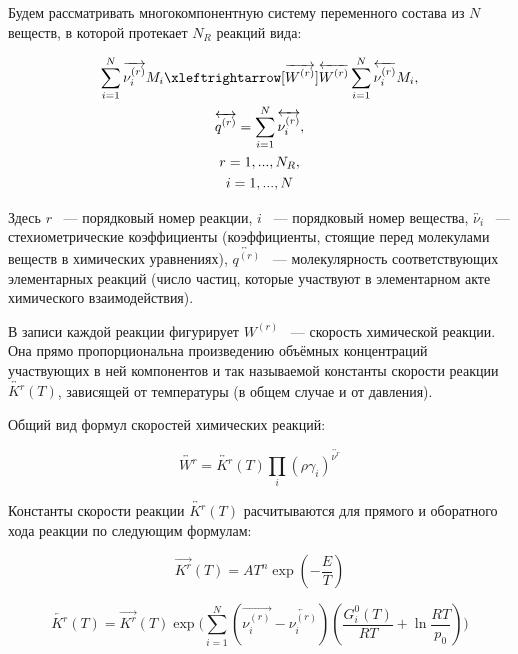 Будем рассматривать многокомпонентную систему переменного состава из $N$ веществ, в которой протекает $N_R$ реакций вида:

\begin{equation}
    \begin{gathered}
    \sum\limits_{i = 1}^{N}\overrightarrow{\nu_i^{(r)}}M_i \xleftrightarrow[\overrightarrow{W^{(r)}}]{\overleftarrow{W^{(r)}}} \sum\limits_{i = 1}^{N}\overleftarrow{\nu_i^{(r)}}M_i,\\
    \overleftrightarrow{q^{(r)}} = \sum\limits_{i = 1}^{N}\overleftrightarrow{\nu_i^{(r)}},\\
    r = 1, ..., N_R,\\
    i = 1, ..., N
    \end{gathered}
    \label{eq:ChemCommon}
\end{equation}

Здесь $r$ ~--- порядковый номер реакции, $i$ ~--- порядковый номер вещества, $\overleftrightarrow{\nu_i}$ ~--- стехиометрические коэффициенты
(коэффициенты, стоящие перед молекулами веществ в химических уравнениях), $\overleftrightarrow{q^{(r)}}$ ~--- молекулярность
соответствующих элементарных реакций (число частиц, которые участвуют в элементарном акте химического взаимодействия).

В записи каждой реакции фигурирует $W^{(r)}$ ~--- скорость химической реакции. Она прямо пропорциональна произведению объёмных концентраций
участвующих в ней компонентов и так называемой константы скорости реакции $\overleftrightarrow{K^{r}}(T)$, зависящей от температуры
(в общем случае и от давления).

Общий вид формул скоростей химических реакций:

\begin{equation}
    \overleftrightarrow{W^{r}} = \overleftrightarrow{K^{r}}(T)\prod\limits_i(\rho\gamma_i)^{\overleftrightarrow{\nu^{r}}}
    \label{eq:Warrow}
\end{equation}

Константы скорости реакции $\overleftrightarrow{K^{r}}(T)$ расчитываются для прямого и оборатного хода реакции по следующим формулам:

\begin{equation}
    \overrightarrow{K^{r}}(T) = AT^n\exp{(-\dfrac{E}{T})}
    \label{eq:Kright}
\end{equation}

\begin{equation}
    \overleftarrow{K^{r}}(T) = \overrightarrow{K^{r}}(T)\exp{\bigg(\sum\limits_{i=1}^N(\overrightarrow{\nu_i^{(r)}} - \overleftarrow{\nu_i^{(r)}})(\dfrac{G_i^0(T)}{RT} + \ln{\dfrac{RT}{p_0}})\bigg)}
    \label{eq:Kleft}
\end{equation}

